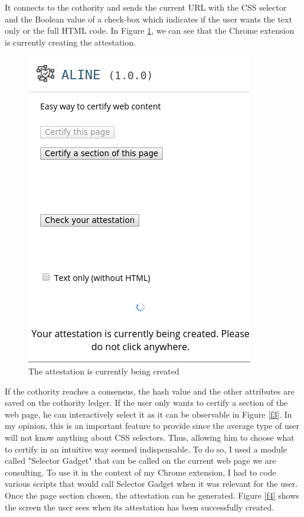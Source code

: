 It connects to the cothority and sends the current URL with the CSS selector and the Boolean value of a check-box which indicates if the user wants the text only or the full HTML code. In Figure \ref{f2}, we can see that the Chrome extension is currently creating the attestation.

\begin{figure}[H]
    \centering
    \includegraphics[width=0.4\linewidth, frame]{images/attest_currently_created.png}
    \caption{The attestation is currently being created}
    \label{f2}
\end{figure}

If the cothority reaches a consensus, the hash value and the other attributes are saved on the cothority ledger. If the user only wants to certify a section of the web page, he can interactively select it as it can be observable in Figure \ref{f3}. In my opinion, this is an important feature to provide since the average type of user will not know anything about CSS selectors. Thus, allowing him to choose what to certify in an intuitive way seemed indispensable. To do so, I used a module  called "Selector Gadget" \cite{selectorgadget} that can be called on the current web page we are consulting. To use it in the context of my Chrome extension, I had to code various scripts that would call Selector Gadget when it was relevant for the user. Once the page section chosen, the attestation can be generated. Figure \ref{f4} shows the screen the user sees when its attestation has been successfully created.

